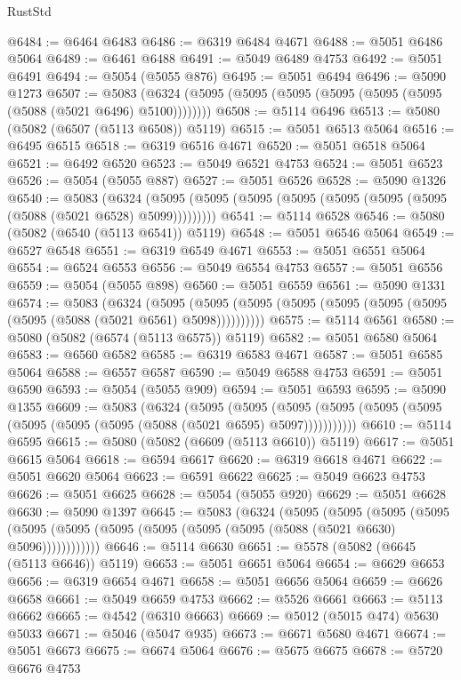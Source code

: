 \begin{lexlean}{RustStd}
\begin{coremodule}
@6484 := @6464 @6483
@6486 := @6319 @6484 @4671
@6488 := @5051 @6486 @5064
@6489 := @6461 @6488
@6491 := @5049 @6489 @4753
@6492 := @5051 @6491
@6494 := @5054 (@5055 @876)
@6495 := @5051 @6494
@6496 := @5090 @1273
@6507 := @5083 (@6324 (@5095 (@5095 (@5095 (@5095 (@5095 (@5095 (@5088 (@5021 @6496) @5100))))))))
@6508 := @5114 @6496
@6513 := @5080 (@5082 (@6507 (@5113 @6508)) @5119)
@6515 := @5051 @6513 @5064
@6516 := @6495 @6515
@6518 := @6319 @6516 @4671
@6520 := @5051 @6518 @5064
@6521 := @6492 @6520
@6523 := @5049 @6521 @4753
@6524 := @5051 @6523
@6526 := @5054 (@5055 @887)
@6527 := @5051 @6526
@6528 := @5090 @1326
@6540 := @5083
    (@6324 (@5095 (@5095 (@5095 (@5095 (@5095 (@5095 (@5095 (@5088 (@5021 @6528) @5099)))))))))
@6541 := @5114 @6528
@6546 := @5080 (@5082 (@6540 (@5113 @6541)) @5119)
@6548 := @5051 @6546 @5064
@6549 := @6527 @6548
@6551 := @6319 @6549 @4671
@6553 := @5051 @6551 @5064
@6554 := @6524 @6553
@6556 := @5049 @6554 @4753
@6557 := @5051 @6556
@6559 := @5054 (@5055 @898)
@6560 := @5051 @6559
@6561 := @5090 @1331
@6574 := @5083
    (@6324
      (@5095 (@5095 (@5095 (@5095 (@5095 (@5095 (@5095 (@5095 (@5088 (@5021 @6561) @5098))))))))))
@6575 := @5114 @6561
@6580 := @5080 (@5082 (@6574 (@5113 @6575)) @5119)
@6582 := @5051 @6580 @5064
@6583 := @6560 @6582
@6585 := @6319 @6583 @4671
@6587 := @5051 @6585 @5064
@6588 := @6557 @6587
@6590 := @5049 @6588 @4753
@6591 := @5051 @6590
@6593 := @5054 (@5055 @909)
@6594 := @5051 @6593
@6595 := @5090 @1355
@6609 := @5083
    (@6324
      (@5095
        (@5095
          (@5095 (@5095 (@5095 (@5095 (@5095 (@5095 (@5095 (@5088 (@5021 @6595) @5097)))))))))))
@6610 := @5114 @6595
@6615 := @5080 (@5082 (@6609 (@5113 @6610)) @5119)
@6617 := @5051 @6615 @5064
@6618 := @6594 @6617
@6620 := @6319 @6618 @4671
@6622 := @5051 @6620 @5064
@6623 := @6591 @6622
@6625 := @5049 @6623 @4753
@6626 := @5051 @6625
@6628 := @5054 (@5055 @920)
@6629 := @5051 @6628
@6630 := @5090 @1397
@6645 := @5083
    (@6324
      (@5095
        (@5095
          (@5095
            (@5095 (@5095 (@5095 (@5095 (@5095 (@5095 (@5095 (@5088 (@5021 @6630) @5096))))))))))))
@6646 := @5114 @6630
@6651 := @5578 (@5082 (@6645 (@5113 @6646)) @5119)
@6653 := @5051 @6651 @5064
@6654 := @6629 @6653
@6656 := @6319 @6654 @4671
@6658 := @5051 @6656 @5064
@6659 := @6626 @6658
@6661 := @5049 @6659 @4753
@6662 := @5526 @6661
@6663 := @5113 @6662
@6665 := @4542 (@6310 @6663)
@6669 := @5012 (@5015 @474) @5630 @5033
@6671 := @5046 (@5047 @935)
@6673 := @6671 @5680 @4671
@6674 := @5051 @6673
@6675 := @6674 @5064
@6676 := @5675 @6675
@6678 := @5720 @6676 @4753

\end{coremodule}
\end{lexlean}

